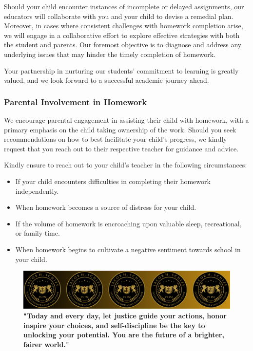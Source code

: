 \documentclass[11pt, letterpaper]{article}
\begin{document}
Should your child encounter instances of incomplete or delayed assignments, our educators will collaborate with you and your child to devise a remedial plan. Moreover, in cases where consistent challenges with homework completion arise, we will engage in a collaborative effort to explore effective strategies with both the student and parents. Our foremost objective is to diagnose and address any underlying issues that may hinder the timely completion of homework.

Your partnership in nurturing our students' commitment to learning is greatly valued, and we look forward to a successful academic journey ahead.

\subsubsection{Parental Involvement in Homework}
We encourage parental engagement in assisting their child with homework, with a primary emphasis on the child taking ownership of the work. Should you seek recommendations on how to best facilitate your child's progress, we kindly request that you reach out to their respective teacher for guidance and advice.

Kindly ensure to reach out to your child's teacher in the following circumstances:
\begin{itemize}
\item If your child encounters difficulties in completing their homework independently.
\item When homework becomes a source of distress for your child.
\item If the volume of homework is encroaching upon valuable sleep, recreational, or family time.
\item When homework begins to cultivate a negative sentiment towards school in your child.  
\end{itemize}

\begin{figure}[H]
  \centering
\includegraphics[width=1\linewidth]{4.png}
\caption{\textbf{"Today and every day, let justice guide your actions, honor inspire your choices, and self-discipline be the key to unlocking your potential. You are the future of a brighter, fairer world."}}
  \label{fig:school symbol}
\end{figure}
\end{document}
